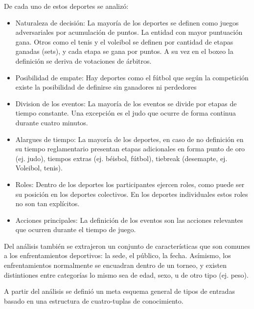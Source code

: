     De cada uno de estos deportes se analizó:

    \begin{itemize}
        \item Naturaleza de decisión: La mayoría de los deportes se definen como juegos 
        adversariales por acumulación de puntos. La entidad con mayor puntuación gana. Otros como el tenis y el voleibol 
        se definen por cantidad de etapas ganadas (sets), y cada etapa se gana por puntos. A su vez en el boxeo la definición 
        se deriva de votaciones de árbitros.
        \item Posibilidad de empate: Hay deportes como el fútbol que según la competición existe la posibilidad de 
        definirse sin ganadores ni perdedores
        \item Division de los eventos: La mayoría de los eventos se divide por etapas de tiempo
        constante. Una excepción es el judo que ocurre de forma continua durante cuatro minutos. 
        \item Alargues de tiempo: La mayoría de los deportes, en caso de no definición en su tiempo reglamentario presentan 
        etapas adicionales en forma punto de oro (ej. judo),  tiempos extras (ej. béisbol, fútbol), tiebreak (desemapte, ej. Voleibol, tenis).
        \item Roles: Dentro de los deportes los participantes ejercen roles, como puede ser su posición en los deportes colectivos. En los deportes 
        individuales estos roles no son tan explícitos.
        \item  Acciones principales: La definición de los eventos son las acciones relevantes que ocurren durante el tiempo de juego.
    \end{itemize}

    Del análisis también se extrajeron un conjunto de características que son comunes a los enfrentamientos deportivos: la sede, 
el público, la fecha. Asímismo, los enfrentamientos normalmente se encuadran dentro de un torneo, y existen distintiones entre categorías lo mismo sea 
de edad, sexo, u de otro tipo (ej. peso).

    A partir del análisis se definió un meta esquema general de tipos de entradas basado en una estructura de 
cuatro-tuplas de conocimiento.

